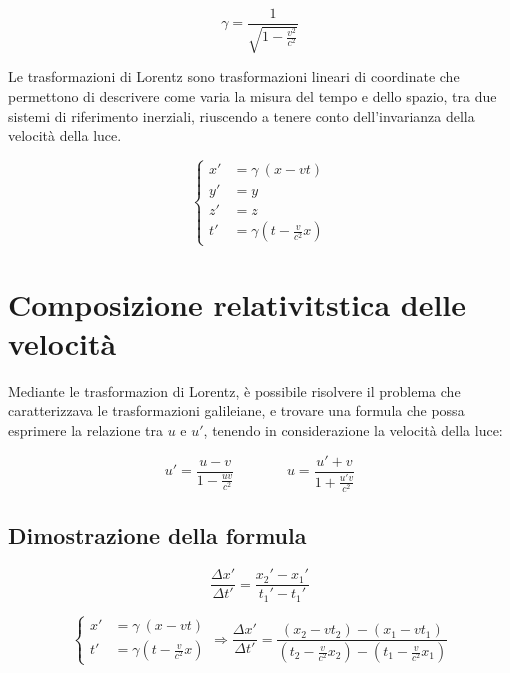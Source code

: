 \documentclass{article}
\begin{document}
\begin{equation}
    \label{gamma}
    \gamma = \frac{1}{\sqrt{1 - \frac{v^2}{c^2}}} 
\end{equation}

Le trasformazioni di Lorentz sono trasformazioni lineari di coordinate
che permettono di descrivere come varia la misura del tempo e dello spazio,
tra due sistemi di riferimento inerziali, riuscendo a tenere conto
dell'invarianza della velocità della luce.

\begin{equation}
    \left\{
        \begin{aligned}
        x' &= \gamma\ (x - vt) \\
        y' &= y \\
        z' &= z \\
        t' &= \gamma \left(t - \frac{v}{c^2} x\right)
        \end{aligned}
    \right.
\end{equation}

\section{Composizione relativitstica delle velocità}
Mediante le trasformazion di Lorentz, è possibile risolvere il
problema che caratterizzava le trasformazioni galileiane, e trovare
una formula che possa esprimere la relazione tra \(u\) e \(u'\),
tenendo in considerazione la velocità della luce:

\begin{equation}
    u' = \frac{u - v}{1 - \frac{uv}{c^2}}\ \ \ \ \ \ \ \ \ \ \ \ \ \ \ \ \ u = \frac{u' + v}{1 + \frac{u'v}{c^2}} %
\end{equation}

\subsection{Dimostrazione della formula}

\begin{equation}
    \frac{\Delta x'}{\Delta t'} = \frac{x_2' - x_1'}{t_1' - t_1'}
\end{equation}

\begin{equation}
    \left\{
        \begin{aligned}
        x' &= \gamma\ (x - vt) \\
        t' &= \gamma \left(t - \frac{v}{c^2} x\right)
        \end{aligned}
    \right.
    \Rightarrow
    \frac{\Delta x'}{\Delta t'} = \frac{(x_2 - vt_2) - (x_1 - vt_1)}{(t_2 - \frac{v}{c^2} x_2) - (t_1 - \frac{v}{c^2} x_1)}
\end{equation}
\end{document}
